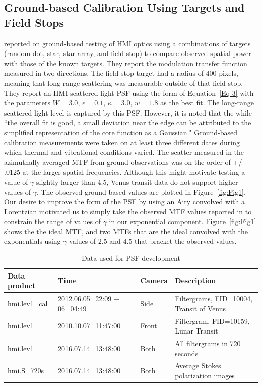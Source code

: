 \documentclass[trackchanges]{aastex62}
\begin{document}
\subsection{Ground-based Calibration Using Targets and Field Stops}\label{sec:sec2.2}

\citet{wachter:2012} reported on ground-based testing of HMI optics using a combinations of targets (random dot, star, star array, and field stop) to compare observed spatial power with those of the known targets. They report the modulation transfer function measured in two directions. The field stop target had a radius of 400 pixels, meaning that long-range scattering was measurable outside of that field stop. They report an HMI scattered light PSF using the form of Equation~\ref{Eq-3} with the parameters $W=3.0$, $\epsilon=0.1$, $\kappa=3.0$, $w=1.8$ as the best fit.  The long-range scattered light level is captured by this PSF. However, it is noted that the while ``the overall fit is good, a small deviation near the edge can be attributed to the simplified representation of the core function as a Gaussian." Ground-based calibration measurements were taken on at least three different dates during which thermal and vibrational conditions varied.  The scatter measured in the azimuthally averaged MTF from ground observations was on the order of +/- .0125 at the larger spatial frequencies. Although this might motivate testing a value of $\gamma$ slightly larger than 4.5, Venus transit data do not support higher values of $\gamma$. The observed ground-based values are plotted in Figure~\ref{fig:Fig1}. Our desire to improve the form of the PSF by using an Airy convolved with a Lorentzian motivated us to
simply take the observed MTF values reported in \citet{wachter:2012} to constrain the range of values of $\gamma$ in our exponential component. Figure~\ref{fig:Fig1} shows the the ideal MTF, 
and two MTFs that are the ideal convolved with the exponentials using $\gamma$ values of 2.5 and 4.5 that bracket the observed values.

 \begin{table}[hb]
\caption{Data used for PSF development\label{tab:dataproducts}}
\centering
\begin{tabular}{llll}
\hline  
Data product & Time & Camera & Description\\
\hline
\hline
hmi.lev1\_cal & 2012.06.05\_22:09 $-$ 06\_04:49 &Side & Filtergrams, FID=10004, Transit of Venus  \\
hmi.lev1 & 2010.10.07\_11:47:00& Front & Filtergram, FID=10159, Lunar Transit \\
hmi.lev1 & 2016.07.14\_13:48:00 & Both & All filtergrams in 720 seconds\\
hmi.S\_720s & 2016.07.14\_13:48:00 & Both & Average Stokes polarization images\\
\hline 
\end{tabular}
\label{tab:table1}
\end{table}
\end{document}
